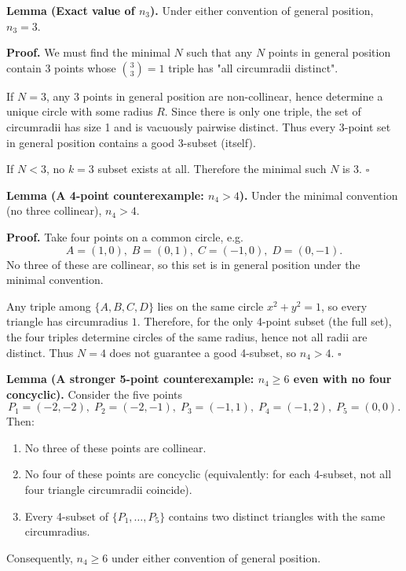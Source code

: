 \noindent\textbf{Lemma (Exact value of $n_3$).}
Under either convention of general position, $n_3=3$.

\noindent\textbf{Proof.}
We must find the minimal $N$ such that any $N$ points in general position contain $3$ points whose $\binom{3}{3}=1$ triple has "all circumradii distinct".

If $N=3$, any 3 points in general position are non-collinear, hence determine a unique circle with some radius $R$. Since there is only one triple, the set of circumradii has size 1 and is vacuously pairwise distinct. Thus every 3-point set in general position contains a good 3-subset (itself).

If $N<3$, no $k=3$ subset exists at all. Therefore the minimal such $N$ is $3$.
\hfill$\square$


\noindent\textbf{Lemma (A 4-point counterexample: $n_4>4$).}
Under the minimal convention (no three collinear), $n_4>4$.

\noindent\textbf{Proof.}
Take four points on a common circle, e.g.
\[
A=(1,0),\;B=(0,1),\;C=(-1,0),\;D=(0,-1).
\]
No three of these are collinear, so this set is in general position under the minimal convention.

Any triple among $\{A,B,C,D\}$ lies on the same circle $x^2+y^2=1$, so every triangle has circumradius $1$. Therefore, for the only 4-point subset (the full set), the four triples determine circles of the same radius, hence not all radii are distinct. Thus $N=4$ does not guarantee a good 4-subset, so $n_4>4$.
\hfill$\square$


\noindent\textbf{Lemma (A stronger 5-point counterexample: $n_4\ge 6$ even with no four concyclic).}
Consider the five points
\[
P_1=(-2,-2),\;P_2=(-2,-1),\;P_3=(-1,1),\;P_4=(-1,2),\;P_5=(0,0).
\]
Then:
\begin{enumerate}
\item No three of these points are collinear.
\item No four of these points are concyclic (equivalently: for each 4-subset, not all four triangle circumradii coincide).
\item Every 4-subset of $\{P_1,\dots,P_5\}$ contains two distinct triangles with the same circumradius.
\end{enumerate}
Consequently, $n_4\ge 6$ under either convention of general position.

